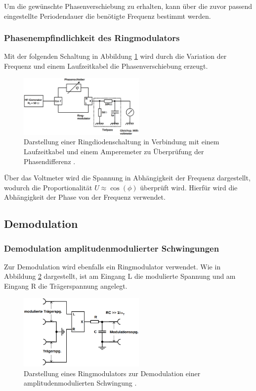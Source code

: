 Um die gewünschte Phasenverschiebung zu erhalten, kann über die zuvor passend eingestellte Periodendauer die benötigte Frequenz bestimmt werden.

\subsubsection{Phasenempfindlichkeit des Ringmodulators}
\label{sec:Phasenempfindlichkeit_der_Gleichrichterdiode}
Mit der folgenden Schaltung in Abbildung \ref{fig_11} wird durch die Variation der Frequenz und einem Laufzeitkabel die Phasenverschiebung erzeugt. 
\begin{figure}
    \centering
    \includegraphics[width=0.55\textwidth]{ressources/A11.png}
    \caption{Darstellung einer Ringdiodenschaltung in Verbindung mit einem Laufzeitkabel und einem Amperemeter zu Überprüfung der Phasendifferenz \cite{skript}.}
    \label{fig_11}
\end{figure}
Über das Voltmeter wird die Spannung in Abhängigkeit der Frequenz dargestellt, wodurch die Proportionalität $U\approx\cos{(\phi)}$ überprüft wird. Hierfür wird die Abhängigkeit der Phase von der Frequenz verwendet.

\subsection{Demodulation}

\subsubsection{Demodulation amplitudenmodulierter Schwingungen}
\label{sec:Demodulation_amplitudenmodulieter_Schwingungen}
Zur Demodulation wird ebenfalls ein Ringmodulator verwendet. Wie in Abbildung \ref{fig_04} dargestellt, ist am Eingang L die modulierte Spannung und am Eingang R die Trägerspannung angelegt. 

\begin{figure}
    \centering
    \includegraphics[width=0.55\textwidth]{ressources/A4.png}
    \caption{Darstellung eines Ringmodulators zur Demodulation einer amplitudenmodulierten Schwingung \cite{skript}.}
    \label{fig_04}
\end{figure}

